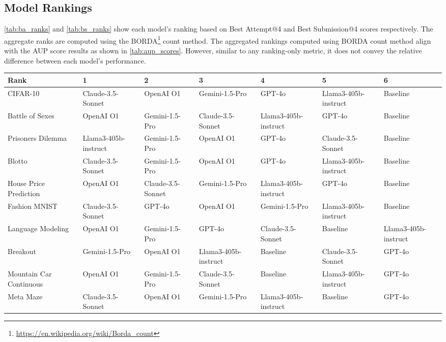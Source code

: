 \subsection{Model Rankings}
\label{sec:raw_results_appendix}

\autoref{tab:ba_ranks} and \autoref{tab:bs_ranks} show each model's ranking based on Best Attempt@4 and Best Submission@4 scores respectively. The aggregate ranks are computed using the BORDA\footnote{\url{https://en.wikipedia.org/wiki/Borda_count}} count method.
The aggregated rankings computed using BORDA count method align with the AUP score results as shown in \autoref{tab:aup_scores}. However, similar to any ranking-only metric, it does not convey the relative difference between each model's performance.

\begin{table*}[!htb]
    \centering
    \begin{adjustbox}{width=\textwidth}
    \begin{NiceTabular}{lllllll}
        \toprule
        Rank & 1 & 2 & 3 & 4 & 5 & 6 \\
        \midrule
        CIFAR-10 & Claude-3.5-Sonnet & OpenAI O1 & Gemini-1.5-Pro & GPT-4o & Llama3-405b-instruct & Baseline \\
        Battle of Sexes & OpenAI O1 & Gemini-1.5-Pro & Claude-3.5-Sonnet & Llama3-405b-instruct & GPT-4o & Baseline \\
        Prisoners Dilemma & Llama3-405b-instruct & Gemini-1.5-Pro & OpenAI O1 & GPT-4o & Claude-3.5-Sonnet & Baseline \\
        Blotto & Claude-3.5-Sonnet & Gemini-1.5-Pro & OpenAI O1 & GPT-4o & Llama3-405b-instruct & Baseline \\
        House Price Prediction & OpenAI O1 & Claude-3.5-Sonnet & Gemini-1.5-Pro & Llama3-405b-instruct & GPT-4o & Baseline \\
        Fashion MNIST & Claude-3.5-Sonnet & GPT-4o & OpenAI O1 & Gemini-1.5-Pro & Llama3-405b-instruct & Baseline \\
        Language Modeling & OpenAI O1 & Gemini-1.5-Pro & GPT-4o & Claude-3.5-Sonnet & Baseline & Llama3-405b-instruct \\
        Breakout & Gemini-1.5-Pro & OpenAI O1 & Llama3-405b-instruct & Baseline & Claude-3.5-Sonnet & GPT-4o \\
        Mountain Car Continuous & OpenAI O1 & Gemini-1.5-Pro & Claude-3.5-Sonnet & Baseline & Llama3-405b-instruct & GPT-4o \\
        Meta Maze & Claude-3.5-Sonnet & OpenAI O1 & Gemini-1.5-Pro & Llama3-405b-instruct & Baseline & GPT-4o \\

\end{NiceTabular}
\end{adjustbox}
\end{table*}
